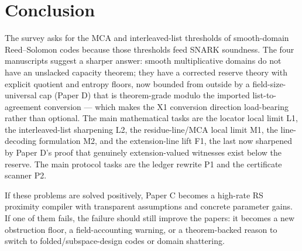 \documentclass[11pt]{article}
\theoremstyle{definition}
\theoremstyle{remark}
\newcommand{\paperC}{Paper C}
\newcommand{\paperD}{Paper D}
\begin{document}
\section{Conclusion}

The survey asks for the MCA and interleaved-list thresholds of smooth-domain Reed--Solomon codes because those thresholds feed SNARK soundness.  The four manuscripts suggest a sharper answer: smooth multiplicative domains do not have an unslacked capacity theorem; they have a corrected reserve theory with explicit quotient and entropy floors, now bounded from outside by a field-size-universal cap (\paperD) that is theorem-grade modulo the imported list-to-agreement conversion --- which makes the X1 conversion direction load-bearing rather than optional.  The main mathematical tasks are the locator local limit L1, the interleaved-list sharpening L2, the residue-line/MCA local limit M1, the line-decoding formulation M2, and the extension-line lift F1, the last now sharpened by \paperD's proof that genuinely extension-valued witnesses exist below the reserve.  The main protocol tasks are the ledger rewrite P1 and the certificate scanner P2.

If these problems are solved positively, \paperC{} becomes a high-rate RS proximity compiler with transparent assumptions and concrete parameter gains.  If one of them fails, the failure should still improve the papers: it becomes a new obstruction floor, a field-accounting warning, or a theorem-backed reason to switch to folded/subspace-design codes or domain shattering.
\end{document}
